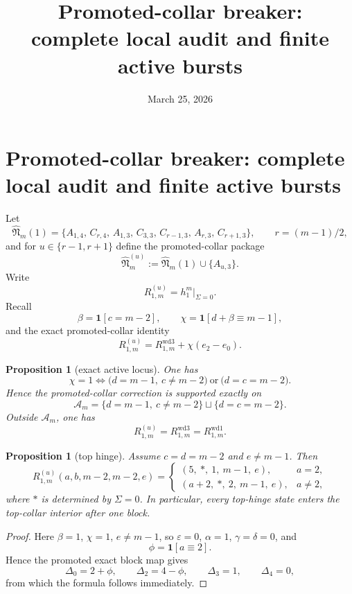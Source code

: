 \documentclass[11pt]{article}
\title{Promoted-collar breaker:\\ complete local audit and finite active bursts}
\author{}
\date{March 25, 2026}
\newtheorem{proposition}[theorem]{Proposition}
\begin{document}
\maketitle

\section{Promoted-collar breaker: complete local audit and finite active bursts}

Let
\[
\widehat{\mathfrak N}_m(1)
=
\{A_{1,4},\,C_{r,4},\,A_{1,3},\,C_{3,3},\,C_{r-1,3},\,A_{r,3},\,C_{r+1,3}\},
\qquad r=(m-1)/2,
\]
and for \(u\in\{r-1,r+1\}\) define the promoted-collar package
\[
\widehat{\mathfrak N}_m^{(u)}:=\widehat{\mathfrak N}_m(1)\cup\{A_{u,3}\}.
\]
Write
\[
R^{(u)}_{1,m}=h_1^m\big|_{\Sigma=0}.
\]
Recall
\[
\beta=\mathbf 1[c=m-2],
\qquad
\chi=\mathbf 1[d+\beta\equiv m-1],
\]
and the exact promoted-collar identity
\[
R^{(u)}_{1,m}=R^{\mathrm{wd3}}_{1,m}+\chi(e_2-e_0).
\]

\begin{proposition}[exact active locus]
\label{prop:promoted-active-locus}
One has
\[
\chi=1
\iff
\bigl(d=m-1,\ c\neq m-2\bigr)\ \text{or}\ \bigl(d=c=m-2\bigr).
\]
Hence the promoted-collar correction is supported exactly on
\[
\mathcal A_m
=
\{d=m-1,\ c\neq m-2\}\sqcup\{d=c=m-2\}.
\]
Outside \(\mathcal A_m\), one has
\[
R^{(u)}_{1,m}=R^{\mathrm{wd3}}_{1,m}=R^{\mathrm{wd1}}_{1,m}.
\]
\end{proposition}

\begin{proposition}[top hinge]
\label{prop:promoted-top-hinge}
Assume \(c=d=m-2\) and \(e\neq m-1\). Then
\[
R^{(u)}_{1,m}(a,b,m-2,m-2,e)
=
\begin{cases}
(5,\ *,\ 1,\ m-1,\ e), & a=2,\\[1mm]
(a+2,\ *,\ 2,\ m-1,\ e), & a\neq 2,
\end{cases}
\]
where \(*\) is determined by \(\Sigma=0\). In particular, every top-hinge state enters the top-collar interior after one block.
\end{proposition}

\begin{proof}
Here \(\beta=1\), \(\chi=1\), \(e\neq m-1\), so \(\varepsilon=0\), \(\alpha=1\), \(\gamma=\delta=0\), and
\[
\phi=\mathbf 1[a\equiv 2].
\]
Hence the promoted exact block map gives
\[
\Delta_0=2+\phi,\qquad \Delta_2=4-\phi,\qquad \Delta_3=1,\qquad \Delta_4=0,
\]
from which the formula follows immediately.
\end{proof}
\end{document}
